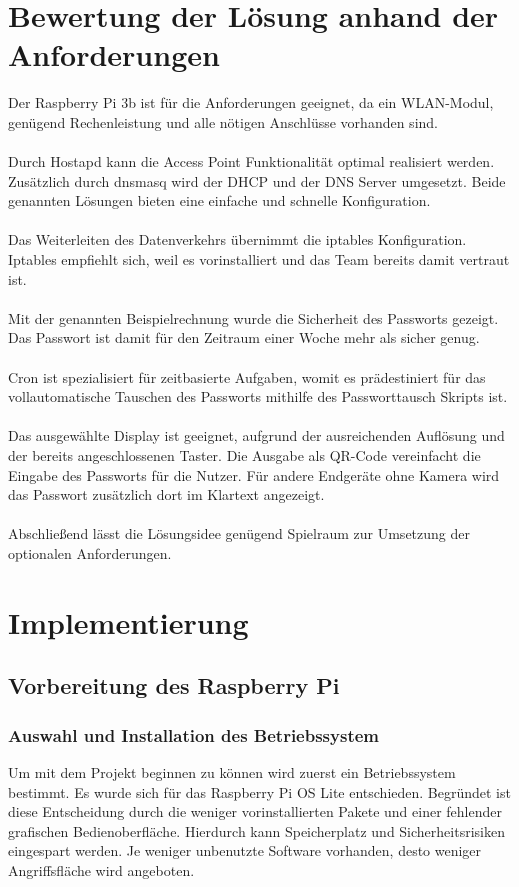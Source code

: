 \documentclass[a4paper,11pt,singlespacing]{article}
\begin{document}
		
	\section{Bewertung der Lösung anhand der Anforderungen}
    	Der Raspberry Pi 3b ist für die Anforderungen geeignet, da ein WLAN-Modul, genügend Rechenleistung und alle nötigen Anschlüsse vorhanden sind. \\ \\
    	Durch Hostapd kann die Access Point Funktionalität optimal realisiert werden. Zusätzlich durch dnsmasq wird der DHCP und der DNS Server umgesetzt. Beide genannten Lösungen bieten eine einfache und schnelle Konfiguration. \\ \\
    	Das Weiterleiten des Datenverkehrs übernimmt die iptables Konfiguration. Iptables empfiehlt sich, weil es vorinstalliert und das Team bereits damit vertraut ist. \\ \\
    	Mit der genannten Beispielrechnung wurde die Sicherheit des Passworts gezeigt. Das Passwort ist damit für den Zeitraum einer Woche mehr als sicher genug. \\ \\
    	Cron ist spezialisiert für zeitbasierte Aufgaben, womit es prädestiniert für das vollautomatische Tauschen des Passworts mithilfe des Passworttausch Skripts ist. \\ \\
    	Das ausgewählte Display ist geeignet, aufgrund der ausreichenden Auflösung und der bereits angeschlossenen Taster. Die Ausgabe als QR-Code vereinfacht die Eingabe des Passworts für die Nutzer. Für andere Endgeräte ohne Kamera wird das Passwort zusätzlich dort im Klartext angezeigt. \\ \\
    	Abschließend lässt die Lösungsidee genügend Spielraum zur Umsetzung der optionalen Anforderungen.
    	
    \section{Implementierung}
    	\subsection{Vorbereitung des Raspberry Pi}
    	\subsubsection{Auswahl und Installation des Betriebssystem}
    	    Um mit dem Projekt beginnen zu können wird zuerst ein Betriebssystem bestimmt.
        	Es wurde sich für das Raspberry Pi OS Lite entschieden. Begründet ist diese Entscheidung durch die weniger vorinstallierten Pakete und einer fehlender grafischen Bedienoberfläche. Hierdurch kann Speicherplatz und Sicherheitsrisiken eingespart werden. Je weniger unbenutzte Software vorhanden, desto weniger Angriffsfläche wird angeboten. \\ 
    	
\end{document}
